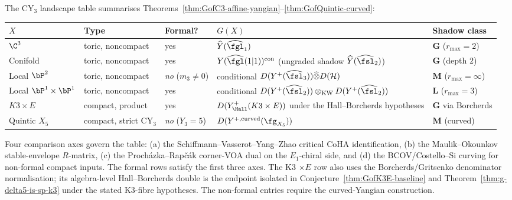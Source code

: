 \begin{remark}
\label{rem:cy3-landscape-GofX-table}
The CY$_3$ landscape table summarises
Theorems~\ref{thm:GofC3-affine-yangian}--\ref{thm:GofQuintic-curved}:
\begin{center}
\begin{tabular}{lllll}
\hline
$X$ & Type & Formal? & $G(X)$ & Shadow class \\
\hline
$\C^3$ & toric, noncompact & yes & $\widehat{Y}(\widehat{\fgl}_1)$
 & $\mathbf{G}$ ($r_{\max} = 2$) \\
Conifold & toric, noncompact & yes & $Y(\widehat{\fgl}(1|1))^{\mathrm{con}}$ (ungraded shadow $\widehat{Y}(\widehat{\fsl}_2)$)
 & $\mathbf{G}$ (depth $2$) \\
Local $\bP^2$ & toric, noncompact & \emph{no} ($m_3 \ne 0$)
 & conditional $D(Y^+(\widehat{\fsl}_3)) \widehat\otimes D(\mathcal H)$
 & $\mathbf{M}$ ($r_{\max} = \infty$) \\
Local $\bP^1 \times \bP^1$ & toric, noncompact & yes
 & conditional $D(Y^+(\widehat{\fsl}_2)) \otimes_{\mathrm{KW}} D(Y^+(\widehat{\fsl}_2))$
 & $\mathbf{L}$ ($r_{\max} = 3$) \\
$K3 \times E$ & compact, product & yes
 & $D(Y^+_{\Hall}(K3\times E))$ under the Hall--Borcherds hypotheses
 & $\mathbf{G}$ via Borcherds \\
Quintic $X_5$ & compact, strict CY$_3$ & \emph{no} ($Y_3 = 5$)
 & $D(Y^{+,\mathrm{curved}}(\fg_{X_5}))$ & $\mathbf{M}$ (curved) \\
\hline
\end{tabular}
\end{center}
Four comparison axes govern the table: (a) the
Schiffmann--Vasserot--Yang--Zhao critical CoHA identification,
(b) the Maulik--Okounkov stable-envelope \(R\)-matrix, (c) the
Proch\'azka--Rap\v{c}\'ak corner-VOA dual on the \(E_1\)-chiral side,
and (d) the BCOV/Costello--Si curving for non-formal compact inputs.
The formal rows satisfy the first three axes. The K3 $\times E$ row also
uses the Borcherds/Gritsenko denominator normalisation; its
algebra-level Hall--Borcherds double is the endpoint isolated in
Conjecture~\ref{thm:GofK3E-baseline} and
Theorem~\ref{thm:g-delta5-is-sp-k3} under the stated K3-fibre
hypotheses. The non-formal entries require the curved-Yangian
construction.
\end{remark}

